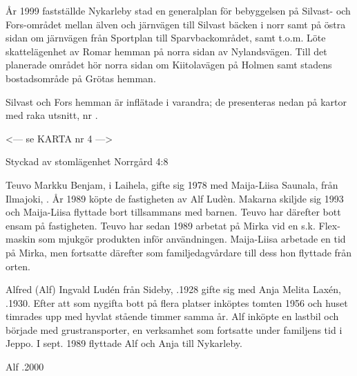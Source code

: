 
År 1999 fastställde Nykarleby stad en generalplan för bebyggelsen på Silvast- och Fors-området mellan älven och järnvägen till Silvast bäcken i norr samt på östra sidan om järnvägen från Sportplan till Sparvbackområdet, samt t.o.m. Löte skattelägenhet av Romar hemman på norra sidan av Nylandsvägen. Till det planerade området hör norra sidan om Kiitolavägen på Holmen samt stadens bostadsområde på Grötas hemman.


Silvast och Fors hemman är inflätade i varandra; de presenteras nedan på kartor med raka utsnitt, nr .




<--- se KARTA nr 4 --->


%

Styckad av stomlägenhet Norrgård 4:8


%
Teuvo Markku Benjam,  i Laihela, gifte sig 1978 med Maija-Liisa Saunala, från Ilmajoki, . År 1989 köpte de fastigheten av Alf Ludèn. Makarna skiljde sig 1993 och Maija-Liisa flyttade bort tillsammans med barnen. Teuvo har därefter bott ensam på fastigheten. Teuvo har sedan 1989 arbetat på Mirka vid en s.k. Flex-maskin som mjukgör produkten inför användningen. Maija-Liisa arbetade en tid på Mirka, men fortsatte därefter som familjedagvårdare till dess hon flyttade från orten.
\begin{jhchildren}
  \item {}
  \item {}
  \item {}
  \item {}
\end{jhchildren}


%
Alfred (Alf) Ingvald Ludén från Sideby, .1928 gifte sig med Anja Melita Laxén, .1930. Efter att som nygifta bott på flera platser inköptes tomten 1956 och huset timrades upp med hyvlat stående timmer samma år. Alf inköpte en lastbil och började med grustransporter, en verksamhet som fortsatte under familjens tid i Jeppo. I sept. 1989 flyttade Alf och Anja till Nykarleby.
\begin{jhchildren}
  \item {}
  \item {}
\end{jhchildren}
Alf .2000



